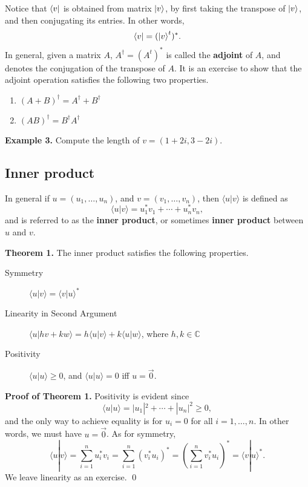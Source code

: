 \documentclass [12pt]{article}
\theoremstyle{definition}
\begin{document}
Notice that $\bra{v}$ is obtained from matrix $\ket{v}$, by first taking the transpose of $\ket{v}$, and then conjugating its entries. In other words,
\[\bra{v} = (\ket{v}^t)^*.\]
In general, given a matrix $A$, $A^{\dagger}=(A^t)^*$ is called the \textbf{adjoint} of $A$, and denotes the conjugation of the transpose of $A$. 
It is an exercise to show that the adjoint operation satisfies the 
following two properties.

\begin{enumerate}
\item $(A+B)^{\dagger} = A^{\dagger} + B^{\dagger}$
\item $(AB)^{\dagger} = B^\dagger A^{\dagger}$
\end{enumerate}

\newpage
\textbf{Example 3.} Compute the length of $v=(1+2i,3-2i)$.

\vspace{2.0in}

\subsection*{Inner product}
In general if  $u=(u_1,\ldots,u_n)$, and $v=(v_1,\ldots,v_n)$, then $\langle u|v\rangle$ is defined as
\[\langle u|v\rangle = u^*_1v_1+\cdots + u^*_nv_n,\]
and is referred to as the \textbf{inner product}, or sometimes \textbf{inner product} between $u$ and $v$.

\textbf{Theorem 1.}
The inner product satisfies the following properties.

\begin{description}
\item[Symmetry] $\langle u|v\rangle=\langle v|u\rangle^*$
\item[Linearity in Second Argument] $\langle u|hv + kw\rangle=h\langle u|v\rangle+k\langle u|w\rangle$, where $h,k\in \mathbb{C}$
\item[Positivity] $\langle u|u\rangle\geq 0$, and $\langle u|u\rangle = 0$ iff $u=\vec{0}$.
\end{description}

\textbf{Proof of Theorem 1.} Positivity is evident since 
\[\langle u|u\rangle = |u_1|^2+\cdots +|u_n|^2 \geq 0,\]
and the only way to achieve equality is for $u_i=0$ for all $i=1,\ldots,n$. In other words, we must have $u=\vec{0}$.
As for symmetry,
\[\langle u|v\rangle = \sum_{i=1}^{n}u^*_iv_i = \sum_{i=1}^{n}(v^*_iu_i)^*=(\sum_{i=1}^{n}v^*_iu_i)^* = \langle v|u\rangle^*.\]
We leave linearity as an exercise. \qed
\end{document}
